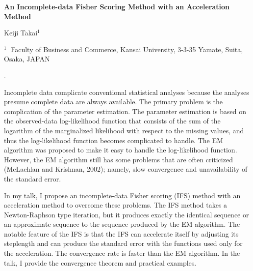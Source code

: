 \documentclass[12pt]{article}
\begin{document}
\begin{flushleft}


 {\LARGE\bf An Incomplete-data Fisher Scoring Method with an Acceleration Method
}


\vspace{1.0cm}

Keiji Takai$^1$ 

\begin{description}

\item $^1 \;$ Faculty of Business and Commerce, Kansai University,
			3-3-35 Yamate, Suita, Osaka,
			JAPAN

\end{description}

\end{flushleft}


\vspace{0.75cm}

.

Incomplete data complicate conventional statistical analyses because the
analyses presume complete data are always available. The primary problem
is the complication of the parameter
estimation. The parameter estimation is based on the observed-data
log-likelihood function that consists of the sum of the logarithm of the
marginalized likelihood with respect to the missing values, and thus the
log-likelihood function becomes complicated to handle. The EM algorithm
was proposed to make it easy to handle the log-likelihood
function. However, the EM algorithm still has some problems that are
often criticized (McLachlan and Krishnan, 2002); namely, slow
convergence and unavailability of the standard error.
 

In my talk, I propose an incomplete-data Fisher scoring (IFS) method
with an acceleration method to overcome these problems.  The IFS method
takes a Newton-Raphson type iteration, but it produces exactly the
identical sequence or an approximate sequence to the sequence produced
by the EM algorithm. The notable feature of the IFS is that the IFS can
accelerate itself by adjusting its steplength and can produce the
standard error with the functions used only for the acceleration. The
convergence rate is faster than the EM algorithm. In the talk, I provide
the convergence theorem and practical examples.
\end{document}
